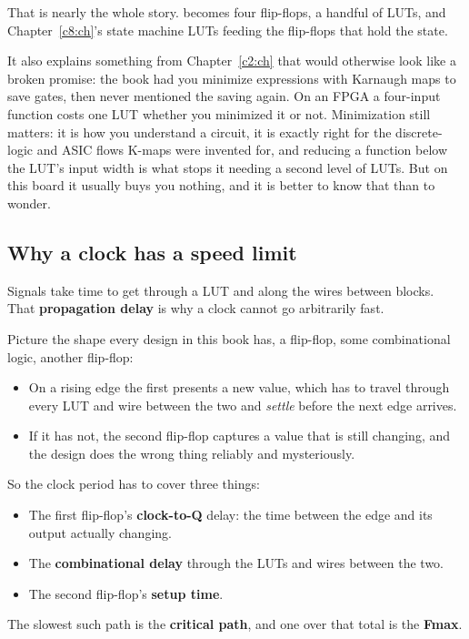 That is nearly the whole story.  becomes four flip-flops,  a handful
of LUTs, and Chapter~\ref{c8:ch}'s state machine LUTs feeding the flip-flops that hold the state.

It also explains something from Chapter~\ref{c2:ch} that would otherwise look like a broken
promise: the book had you minimize expressions with Karnaugh maps to save gates, then never
mentioned the saving again. On an FPGA a four-input function costs one LUT whether you minimized it
or not. Minimization still matters: it is how you understand a circuit, it is exactly right for the
discrete-logic and ASIC flows K-maps were invented for, and reducing a function below the LUT's
input width is what stops it needing a second level of LUTs. But on this board it usually buys you
nothing, and it is better to know that than to wonder.

\subsection{Why a clock has a speed limit}
\label{c5:fmax}
Signals take time to get through a LUT and along the wires between blocks. That \textbf{propagation
delay} is why a clock cannot go arbitrarily fast.

Picture the shape every design in this book has, a flip-flop, some combinational logic, another
flip-flop:
\begin{itemize}
  \item On a rising edge the first presents a new value, which has to travel through every LUT and
    wire between the two and \emph{settle} before the next edge arrives.
  \item If it has not, the second flip-flop captures a value that is still changing, and the design
    does the wrong thing reliably and mysteriously.
\end{itemize}
So the clock period has to cover three things:
\begin{itemize}
  \item The first flip-flop's \textbf{clock-to-Q} delay: the time between the edge and its output
    actually changing.
  \item The \textbf{combinational delay} through the LUTs and wires between the two.
  \item The second flip-flop's \textbf{setup time}.
\end{itemize}
The slowest such path is the \textbf{critical path}, and one over that total is the \textbf{Fmax}.

